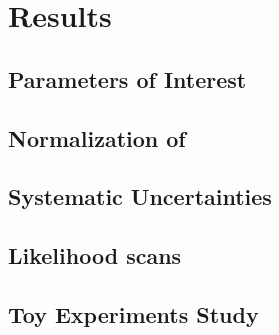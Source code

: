 
\chapter{Results}
\label{Results}

\section{Parameters of Interest}
\section{Normalization of \BsJpsiKpi}
\section{Systematic Uncertainties}
\section{Likelihood scans}
\section{Toy Experiments Study}


